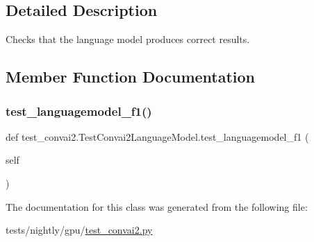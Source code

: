 \subsection{Detailed Description}
\begin{DoxyVerb}Checks that the language model produces correct results.
\end{DoxyVerb}
 

\subsection{Member Function Documentation}
\mbox{\label{classtest__convai2_1_1TestConvai2LanguageModel_a854c13ca56bdf47737d0e54a5e012405}} 
\subsubsection{\texorpdfstring{test\+\_\+languagemodel\+\_\+f1()}{test\_languagemodel\_f1()}}
{\footnotesize\ttfamily def test\+\_\+convai2.\+Test\+Convai2\+Language\+Model.\+test\+\_\+languagemodel\+\_\+f1 (\begin{DoxyParamCaption}\item[{}]{self }\end{DoxyParamCaption})}



The documentation for this class was generated from the following file\+:\begin{DoxyCompactItemize}
\item 
tests/nightly/gpu/\hyperlink{test__convai2_8py}{test\+\_\+convai2.\+py}\end{DoxyCompactItemize}
